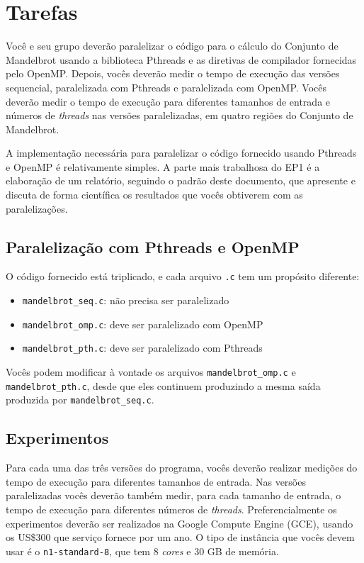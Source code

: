 \documentclass[final,12pt,a4paper]{elsarticle}
\begin{document}
\section{Tarefas}

Você e seu grupo deverão paralelizar o código para o cálculo do Conjunto de
Mandelbrot usando a biblioteca Pthreads e as diretivas de compilador fornecidas
pelo OpenMP. Depois, vocês deverão medir o tempo de execução das versões
sequencial, paralelizada com Pthreads e paralelizada com OpenMP. Vocês deverão
medir o tempo de execução para diferentes tamanhos de entrada e números de
\textit{threads} nas versões paralelizadas, em quatro regiões do Conjunto
de Mandelbrot.

A implementação necessária para paralelizar o código fornecido usando Pthreads
e OpenMP é relativamente simples. A parte mais trabalhosa do EP1 é a elaboração
de um relatório, seguindo o padrão deste documento, que apresente e discuta de
forma científica os resultados que vocês obtiverem com as paralelizações.

\subsection{Paralelização com Pthreads e OpenMP}

O código fornecido está triplicado, e cada arquivo \texttt{.c}
tem um propósito diferente:

\begin{itemize}
    \item \texttt{mandelbrot\_seq.c}: não precisa ser paralelizado
    \item \texttt{mandelbrot\_omp.c}: deve ser paralelizado com OpenMP
    \item \texttt{mandelbrot\_pth.c}: deve ser paralelizado com Pthreads
\end{itemize}

Vocês podem modificar à vontade os arquivos \texttt{mandelbrot\_omp.c} e
\texttt{mandelbrot\_pth.c}, desde que eles continuem produzindo a mesma saída
produzida por \texttt{mandelbrot\_seq.c}.

\subsection{Experimentos}

Para cada uma das três versões do programa, vocês deverão realizar medições do
tempo de execução para diferentes tamanhos de entrada. Nas versões
paralelizadas vocês deverão também medir, para cada tamanho de entrada, o tempo
de execução para diferentes números de \textit{threads}. Preferencialmente
os experimentos deverão ser realizados na Google Compute Engine (GCE),
usando os US\$300 que serviço fornece por um ano. O tipo de instância
que vocês devem usar é o \texttt{n1-standard-8}, que tem 8 \textit{cores}
e 30 GB de memória.
\end{document}

